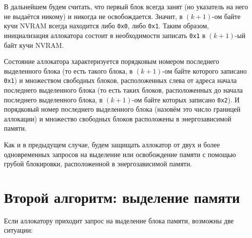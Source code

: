 \documentclass[times,specification,annotation]{itmo-student-thesis}
\begin{document}
В дальнейшем будем считать, что первый блок всегда занят (но указатель на него не выдаётся никому) и никогда не освобождается. Значит, в $(k + 1)$-ом байте кучи NVRAM всегда находится либо \texttt{0x0}, либо \texttt{0x1}. Таким образом, инициализация аллокатора состоит в необходимости записать \texttt{0x1} в $(k + 1)$-ый байт кучи NVRAM.

Состояние аллокатора характеризуется порядковым номером последнего выделенного блока (то есть такого блока, в $(k + 1)$-ом байте которого записано \texttt{0x1}) и множеством свободных блоков, расположенных слева от адреса начала последнего выделенного блока (то есть таких блоков, расположенных до начала последнего выделенного блока, в $(k + 1)$-ом байте которых записано \texttt{0x2}). И порядковый номер последнего выделенного блока (назовём это число границей аллокации) и множество свободных блоков расположены в энергозависимой памяти.

Как и в предыдущем случае, будем защищать аллокатор от двух и более одновременных запросов на выделение или освобождение памяти с помощью грубой блокировки, расположенной в энергозависимой памяти.

\section{Второй алгоритм: выделение памяти}

Если аллокатору приходит запрос на выделение блока памяти, возможны две ситуации:
\end{document}
